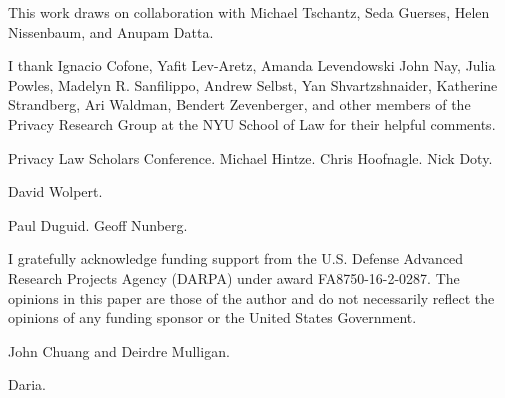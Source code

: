 \documentclass[../thesis.tex]{subfiles}
\begin{document}
This work draws on collaboration with Michael Tschantz, Seda Guerses,
Helen Nissenbaum, and Anupam Datta.

I thank Ignacio Cofone, Yafit Lev-Aretz, Amanda Levendowski
 John Nay, Julia Powles,
Madelyn R. Sanfilippo, Andrew Selbst, Yan Shvartzshnaider, Katherine
Strandberg, Ari Waldman, Bendert Zevenberger,  
and other members of the Privacy Research Group at
the NYU School of Law for their helpful comments.

Privacy Law Scholars Conference. Michael Hintze. Chris Hoofnagle.
Nick Doty.

David Wolpert.

Paul Duguid. Geoff Nunberg.

I gratefully acknowledge funding support 
from the U.S. Defense Advanced Research Projects Agency (DARPA) under
award FA8750-16-2-0287.
The opinions in this paper are those of the author and do not
necessarily reflect the opinions of any funding sponsor or the United
States Government.

John Chuang and Deirdre Mulligan.

Daria.
 
\end{document}
